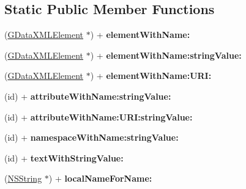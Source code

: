 \subsection*{Static Public Member Functions}
\begin{DoxyCompactItemize}
\item 
\hypertarget{interface_g_data_x_m_l_node_ad7e4405c6195d993a5633faa1899c8a0}{
(\hyperlink{interface_g_data_x_m_l_element}{GDataXMLElement} $\ast$) + {\bfseries elementWithName:}}
\label{interface_g_data_x_m_l_node_ad7e4405c6195d993a5633faa1899c8a0}

\item 
\hypertarget{interface_g_data_x_m_l_node_ad8afb69afa7b083627e8a6db5eba45f7}{
(\hyperlink{interface_g_data_x_m_l_element}{GDataXMLElement} $\ast$) + {\bfseries elementWithName:stringValue:}}
\label{interface_g_data_x_m_l_node_ad8afb69afa7b083627e8a6db5eba45f7}

\item 
\hypertarget{interface_g_data_x_m_l_node_ae1241290bcd76d378ba9a5eb0612b6c4}{
(\hyperlink{interface_g_data_x_m_l_element}{GDataXMLElement} $\ast$) + {\bfseries elementWithName:URI:}}
\label{interface_g_data_x_m_l_node_ae1241290bcd76d378ba9a5eb0612b6c4}

\item 
\hypertarget{interface_g_data_x_m_l_node_abd922c9940730a4f78c906c2392123df}{
(id) + {\bfseries attributeWithName:stringValue:}}
\label{interface_g_data_x_m_l_node_abd922c9940730a4f78c906c2392123df}

\item 
\hypertarget{interface_g_data_x_m_l_node_a82060803e76687ce902f09c96f654ab2}{
(id) + {\bfseries attributeWithName:URI:stringValue:}}
\label{interface_g_data_x_m_l_node_a82060803e76687ce902f09c96f654ab2}

\item 
\hypertarget{interface_g_data_x_m_l_node_a59cd9e673bcf2be9ed19ebbabc68ad26}{
(id) + {\bfseries namespaceWithName:stringValue:}}
\label{interface_g_data_x_m_l_node_a59cd9e673bcf2be9ed19ebbabc68ad26}

\item 
\hypertarget{interface_g_data_x_m_l_node_a13761fd3b75c6f465800e2d4ae45db84}{
(id) + {\bfseries textWithStringValue:}}
\label{interface_g_data_x_m_l_node_a13761fd3b75c6f465800e2d4ae45db84}

\item 
\hypertarget{interface_g_data_x_m_l_node_abaa7cb3204ca104a89895f895728b942}{
(\hyperlink{class_n_s_string}{NSString} $\ast$) + {\bfseries localNameForName:}}
\label{interface_g_data_x_m_l_node_abaa7cb3204ca104a89895f895728b942}


\end{DoxyCompactItemize}
